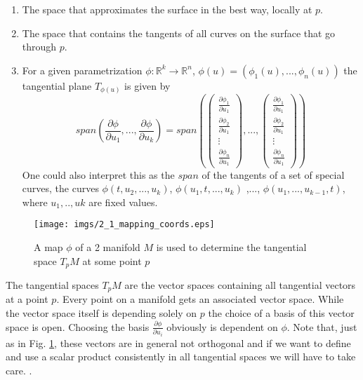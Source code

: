 \begin{enumerate}
	\item The space that approximates the surface in the best way, locally at $p$.
	\item The space that contains the tangents of all curves on the surface that go through $p$.
	\item For a given parametrization $\phi: \mathbb R^k \to \mathbb R^n$, $\phi(u) = (\phi_1(u),...,\phi_n(u))$ the tangential plane $T_{\phi(u)}$ is given by
			\[span(\frac{\partial \phi} {\partial u_1},..., \frac{\partial \phi} {\partial u_k}) = span(\begin{pmatrix}
	\frac{\partial \phi_1} {\partial u_1} \\
	\frac{\partial \phi_2} {\partial u_1}\\
	\vdots\\
	\frac{\partial \phi_n} {\partial u_1}
\end{pmatrix},...,\begin{pmatrix}
	\frac{\partial \phi_1} {\partial u_1} \\
	\frac{\partial \phi_2} {\partial u_1}\\
	\vdots\\
	\frac{\partial \phi_n} {\partial u_1}
\end{pmatrix})\]
	One could also interpret this as the $span$ of the tangents of a set of special curves, the curves $\phi(t, u_2,...,u_k)$, $\phi(u_1, t,...,u_k)$ ,..., $\phi(u_1, ...,u_{k-1},t)$, where $u_1,..,uk$ are fixed values.
\end{enumerate}

\begin{figure}[tb]
\begin{center}
\texttt{[image: imgs/2\_1\_mapping\_coords.eps]}
\end{center}
\caption{A map $\phi$ of a 2 manifold $M$ is used to determine the tangential space $T_{p}M$ at some point $p$}
\label{fig::2_1_mapping_coords}
\end{figure}

The tangential spaces $T_p M$ are the vector spaces containing all tangential vectors at a point $p$. Every point on a manifold gets an associated vector space. While the vector space itself is depending solely on $p$ the choice of a basis of this vector space is open. Choosing the basis $\frac{\partial \phi}{\partial u_i}$ obviously is dependent on $\phi$. Note that, just as in Fig. \ref{fig::2_1_mapping_coords}, these vectors are in general not orthogonal and if we want to define and use a scalar product consistently in all tangential spaces we will have to take care.
.

